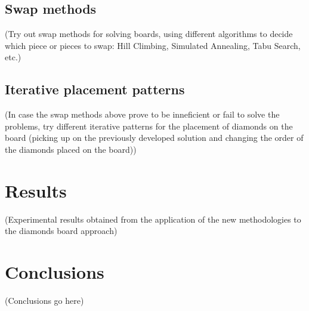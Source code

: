 \documentclass{llncs}
\begin{document}
\subsection{Swap methods}

(Try out swap methods for solving boards, using different algorithms to decide which piece or pieces to swap: Hill Climbing, Simulated Annealing, Tabu Search, etc.)

\subsection{Iterative placement patterns}

(In case the swap methods above prove to be inneficient or fail to solve the problems, try different iterative patterns for the placement of diamonds on the board (picking up on the previously developed solution and changing the order of the diamonds placed on the board))

\section{Results}

(Experimental results obtained from the application of the new methodologies to the diamonds board approach)

\section{Conclusions}

(Conclusions go here)
%
%

\end{document}
